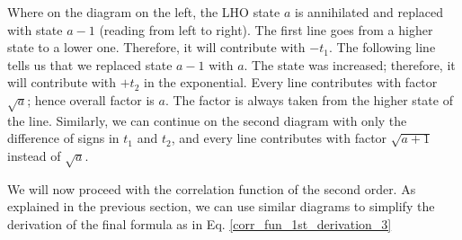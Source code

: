 Where on the diagram on the left, the LHO state $a$ is annihilated and replaced with state $a-1$ (reading from left to right). The first line goes from a higher state to a lower one. Therefore, it will contribute with $-t_1$. The following line tells us that we replaced state $a-1$ with $a$. The state was increased; therefore, it will contribute with $+t_2$ in the exponential. Every line contributes with factor $\sqrt{a}$; hence overall factor is $a$. The factor is always taken from the higher state of the line. Similarly, we can continue on the second diagram with only the difference of signs in $t_1$ and $t_2$, and every line contributes with factor $\sqrt{a+1}$ instead of $\sqrt{a}$.

We will now proceed with the correlation function of the second order. As explained in the previous section, we can use similar diagrams to simplify the derivation of the final formula as in Eq. \ref{corr_fun_1st_derivation_3} 

